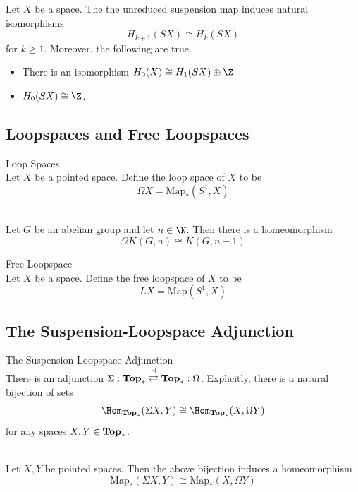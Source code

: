 \documentclass[a4paper]{article}
\begin{document}
\begin{prp}{}{} Let $X$ be a space. The the unreduced suspension map induces natural isomorphisms $$H_{k+1}(SX)\cong H_k(SX)$$ for $k\geq 1$. Moreover, the following are true. 
\begin{itemize}
\item There is an isomorphism $H_0(X)\cong H_1(SX)\oplus\Z$
\item $H_0(SX)\cong\Z$. 
\end{itemize}
\end{prp}

\subsection{Loopspaces and Free Loopspaces}
\begin{defn}{Loop Spaces}{}\\
Let $X$ be a pointed space. Define the loop space of $X$ to be $$\Omega X=\text{Map}_\ast(S^1,X)$$
\end{defn}

\begin{lmm}{}{}\\
Let $G$ be an abelian group and let $n\in\N$. Then there is a homeomorphism $$\Omega K(G,n)\cong K(G,n-1)$$
\end{lmm}

\begin{defn}{Free Loopspace}{}\\
Let $X$ be a space. Define the free loopspace of $X$ to be $$LX=\text{Map}(S^1,X)$$
\end{defn}

\subsection{The Suspension-Loopspace Adjunction}
\begin{thm}{The Suspension-Loopspace Adjunction}{}\\
There is an adjunction $\Sigma:\bold{Top}_\ast\overset{\dashv}{\rightleftarrows}\bold{Top}_\ast:\Omega$. Explicitly, there is a natural bijection of sets $$\Hom_{\bold{Top}_\ast}(\Sigma X,Y)\cong\Hom_{\bold{Top}_\ast}(X,\Omega Y)$$ for any spaces $X,Y\in\bold{Top}_\ast$. 
\end{thm}

\begin{prp}{}{}\\
Let $X,Y$ be pointed spaces. Then the above bijection induces a homeomorphism $$\text{Map}_\ast(\Sigma X,Y)\cong\text{Map}_\ast(X,\Omega Y)$$
\end{prp}
\end{document}
